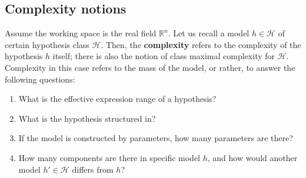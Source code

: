 \documentclass[10pt]{article} %
\begin{document}
\subsection{Complexity notions}
Assume the working space is the real field $\mathbb{R}^{n}$. Let us recall a model $h\in\mathcal{H}$ of certain hypothesis class $\mathcal{H}$. Then, the \textbf{complexity} refers to the complexity of the hypothesis $h$ itself; there is also the notion of class maximal complexity for $\mathcal{H}$. Complexity in this case refers to the mass of the model, or rather, to answer the following questions:
\begin{enumerate}[itemsep=0.5pt,topsep=0.5pt]
    \item What is the effective expression range of a hypothesis?
    \item What is the hypothesis structured in?
    \item If the model is constructed by parameters, how many parameters are there?
    \item How many components are there in specific model $h$, and how would another model $h'\in \mathcal{H}$ differs from $h$?
\end{enumerate}
\end{document}
